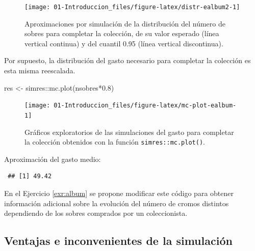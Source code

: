 \documentclass[
  10pt,
]{book}
\newenvironment{Shaded}{\begin{snugshade}}{\end{snugshade}}
\newcommand{\CommentTok}[1]{\textcolor[rgb]{0.56,0.35,0.01}{\textit{#1}}}
\newcommand{\FloatTok}[1]{\textcolor[rgb]{0.00,0.00,0.81}{#1}}
\newcommand{\FunctionTok}[1]{\textcolor[rgb]{0.00,0.00,0.00}{#1}}
\newcommand{\NormalTok}[1]{#1}
\newcommand{\OtherTok}[1]{\textcolor[rgb]{0.56,0.35,0.01}{#1}}
\newcommand{\SpecialCharTok}[1]{\textcolor[rgb]{0.00,0.00,0.00}{#1}}
\theoremstyle{break}
\theoremstyle{nonumberplain}
\renewcommand{\CommentTok}[1]{\textcolor[rgb]{0.41,0.41,0.41}{\texttt{#1}}}
\begin{document}
\begin{figure}[!htbp]

{\centering \texttt{[image: 01-Introduccion\_files/figure-latex/distr-ealbum2-1]} 

}

\caption{Aproximaciones por simulación de la distribución del número de sobres para completar la colección, de su valor esperado (línea vertical continua) y del cuantil 0.95 (línea vertical discontinua).}\label{fig:distr-ealbum2}
\end{figure}

Por supuesto, la distribución del gasto necesario para completar la colección es esta misma reescalada.



\begin{Shaded}
\begin{Highlighting}[]
\NormalTok{res }\OtherTok{\textless{}{-}}\NormalTok{ simres}\SpecialCharTok{::}\FunctionTok{mc.plot}\NormalTok{(nsobres}\SpecialCharTok{*}\FloatTok{0.8}\NormalTok{)}
\end{Highlighting}
\end{Shaded}

\begin{figure}[!htbp]

{\centering \texttt{[image: 01-Introduccion\_files/figure-latex/mc-plot-ealbum-1]} 

}

\caption{Gráficos exploratorios de las simulaciones del gasto para completar la colección obtenidos con la función \texttt{simres::mc.plot()}.}\label{fig:mc-plot-ealbum}
\end{figure}

Aproximación del gasto medio:

\begin{Shaded}
\end{Shaded}

\begin{verbatim}
 ## [1] 49.42
\end{verbatim}

En el Ejercicio \ref{exr:album} se propone modificar este código para obtener información adicional sobre la evolución del número de cromos distintos dependiendo de los sobres comprados por un coleccionista.

\hypertarget{ventajas-e-inconvenientes-de-la-simulaciuxf3n}{%
\subsection{Ventajas e inconvenientes de la simulación}\label{ventajas-e-inconvenientes-de-la-simulaciuxf3n}}
\end{document}
